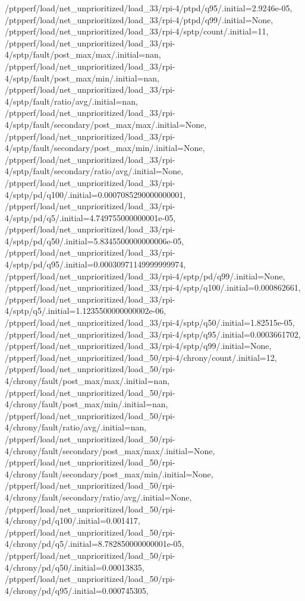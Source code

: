 {    /ptpperf/load/net_unprioritized/load_33/rpi-4/ptpd/q95/.initial=2.9246e-05,
    /ptpperf/load/net_unprioritized/load_33/rpi-4/ptpd/q99/.initial=None,
    /ptpperf/load/net_unprioritized/load_33/rpi-4/sptp/count/.initial=11,
    /ptpperf/load/net_unprioritized/load_33/rpi-4/sptp/fault/post_max/max/.initial=nan,
    /ptpperf/load/net_unprioritized/load_33/rpi-4/sptp/fault/post_max/min/.initial=nan,
    /ptpperf/load/net_unprioritized/load_33/rpi-4/sptp/fault/ratio/avg/.initial=nan,
    /ptpperf/load/net_unprioritized/load_33/rpi-4/sptp/fault/secondary/post_max/max/.initial=None,
    /ptpperf/load/net_unprioritized/load_33/rpi-4/sptp/fault/secondary/post_max/min/.initial=None,
    /ptpperf/load/net_unprioritized/load_33/rpi-4/sptp/fault/secondary/ratio/avg/.initial=None,
    /ptpperf/load/net_unprioritized/load_33/rpi-4/sptp/pd/q100/.initial=0.0007085290000000001,
    /ptpperf/load/net_unprioritized/load_33/rpi-4/sptp/pd/q5/.initial=4.749755000000001e-05,
    /ptpperf/load/net_unprioritized/load_33/rpi-4/sptp/pd/q50/.initial=5.8345500000000006e-05,
    /ptpperf/load/net_unprioritized/load_33/rpi-4/sptp/pd/q95/.initial=0.00030971149999999974,
    /ptpperf/load/net_unprioritized/load_33/rpi-4/sptp/pd/q99/.initial=None,
    /ptpperf/load/net_unprioritized/load_33/rpi-4/sptp/q100/.initial=0.000862661,
    /ptpperf/load/net_unprioritized/load_33/rpi-4/sptp/q5/.initial=1.1235500000000002e-06,
    /ptpperf/load/net_unprioritized/load_33/rpi-4/sptp/q50/.initial=1.82515e-05,
    /ptpperf/load/net_unprioritized/load_33/rpi-4/sptp/q95/.initial=0.0003661702,
    /ptpperf/load/net_unprioritized/load_33/rpi-4/sptp/q99/.initial=None,
    /ptpperf/load/net_unprioritized/load_50/rpi-4/chrony/count/.initial=12,
    /ptpperf/load/net_unprioritized/load_50/rpi-4/chrony/fault/post_max/max/.initial=nan,
    /ptpperf/load/net_unprioritized/load_50/rpi-4/chrony/fault/post_max/min/.initial=nan,
    /ptpperf/load/net_unprioritized/load_50/rpi-4/chrony/fault/ratio/avg/.initial=nan,
    /ptpperf/load/net_unprioritized/load_50/rpi-4/chrony/fault/secondary/post_max/max/.initial=None,
    /ptpperf/load/net_unprioritized/load_50/rpi-4/chrony/fault/secondary/post_max/min/.initial=None,
    /ptpperf/load/net_unprioritized/load_50/rpi-4/chrony/fault/secondary/ratio/avg/.initial=None,
    /ptpperf/load/net_unprioritized/load_50/rpi-4/chrony/pd/q100/.initial=0.001417,
    /ptpperf/load/net_unprioritized/load_50/rpi-4/chrony/pd/q5/.initial=8.782850000000001e-05,
    /ptpperf/load/net_unprioritized/load_50/rpi-4/chrony/pd/q50/.initial=0.00013835,
    /ptpperf/load/net_unprioritized/load_50/rpi-4/chrony/pd/q95/.initial=0.000745305,
}
